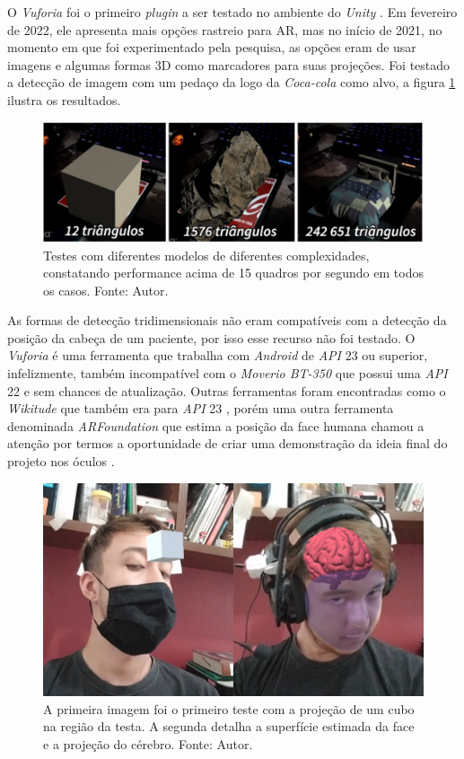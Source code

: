 O \textit{Vuforia} foi o primeiro \textit{plugin} a ser testado no ambiente do \textit{Unity} \cite{Vuforia}. Em fevereiro de 2022, ele apresenta mais opções rastreio para AR, mas no início de 2021, no momento em que foi experimentado pela pesquisa, as opções eram de usar imagens e algumas formas 3D como marcadores para suas projeções. Foi testado a detecção de imagem com um pedaço da logo da \textit{Coca-cola\texttrademark} como alvo, a figura \ref{fig:vuforia-tests} ilustra os resultados.

\begin{figure}[ht]
    \centering
    \includegraphics[width=.85\linewidth]{figuras/Vuforia.png}
    \caption{Testes com diferentes modelos de diferentes complexidades, constatando performance acima de 15 quadros por segundo em todos os casos. Fonte: Autor.}
    \label{fig:vuforia-tests}
\end{figure}

As formas de detecção tridimensionais não eram compatíveis com a detecção da posição da cabeça de um paciente, por isso esse recurso não foi testado. O \textit{Vuforia} é uma ferramenta que trabalha com \textit{Android} de \textit{API} 23 ou superior, infelizmente, também incompatível com o \textit{Moverio BT-350} que possui uma \textit{API} 22 e sem chances de atualização. Outras ferramentas foram encontradas como o \textit{Wikitude\texttrademark} que também era para \textit{API} 23 \cite{wikitudes}, porém uma outra ferramenta denominada \textit{ARFoundation} que estima a posição da face humana chamou a atenção por termos a oportunidade de criar uma demonstração da ideia final do projeto nos óculos \cite{arfoundation-docs}.

\begin{figure}[ht]
    \centering
    \includegraphics[width=.6\linewidth]{figuras/VCranium.png}
    \caption{A primeira imagem foi o primeiro teste com a projeção de um cubo na região da testa. A segunda detalha a superfície estimada da face e a projeção do cérebro. Fonte: Autor.}
    \label{fig:arfoundation}
\end{figure}

